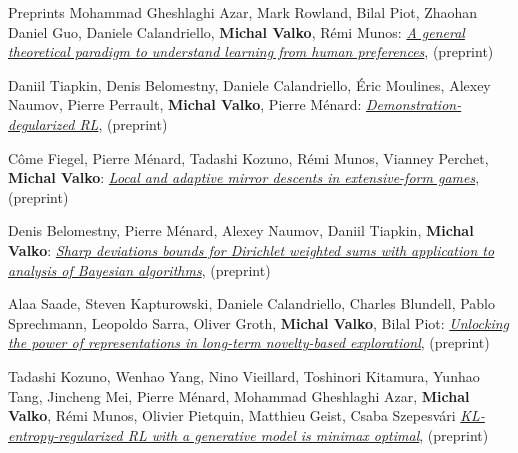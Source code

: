 \documentclass{resume}
\begin{document}
\begin{category}{Preprints}
\citembullet
Mohammad Gheshlaghi Azar, Mark Rowland, Bilal Piot, Zhaohan Daniel Guo, Daniele Calandriello,  {\bf Michal Valko},  R\' emi Munos:
\href{https://arxiv.org/pdf/2310.17303}{\emph{A general theoretical paradigm to understand learning from human preferences}},
({\sf preprint}) 

\citembullet
Daniil Tiapkin, Denis Belomestny, Daniele Calandriello, \' Eric Moulines, Alexey Naumov,  Pierre Perrault, {\bf Michal Valko}, Pierre M\' enard: 
\href{https://arxiv.org/pdf/2310.12036}{\emph{Demonstration-degularized RL}},
({\sf preprint}) 


\citembullet
C\^ome  Fiegel, Pierre Ménard, Tadashi Kozuno, R\' emi Munos, Vianney Perchet,  {\bf Michal Valko}:
\href{https://arxiv.org/pdf/2309.00656.pdf}{\emph{Local and adaptive mirror descents in extensive-form games}},
({\sf preprint}) 



\citembullet
Denis Belomestny, Pierre Ménard, Alexey Naumov, Daniil Tiapkin,  {\bf Michal Valko}:
\href{https://arxiv.org/pdf/2304.03056.pdf}{\emph{Sharp deviations bounds for Dirichlet weighted sums with application to analysis of Bayesian algorithms}},
({\sf preprint}) 

\citembullet
Alaa Saade, Steven Kapturowski, Daniele Calandriello, Charles Blundell, Pablo Sprechmann, Leopoldo Sarra, Oliver Groth,  {\bf Michal Valko}, Bilal Piot:
\href{https://arxiv.org/pdf/2305.01521.pdf}{\emph{Unlocking the power of representations in long-term novelty-based explorationl}},
({\sf preprint}) 

\citembullet
Tadashi Kozuno, Wenhao Yang, Nino Vieillard, Toshinori Kitamura, Yunhao Tang, Jincheng Mei, Pierre M\' enard, Mohammad Gheshlaghi Azar, {\bf Michal Valko}, R\' emi Munos, Olivier Pietquin, Matthieu Geist, Csaba Szepesv\' ari
\href{https://arxiv.org/pdf/2205.14211.pdf}{\emph{KL-entropy-regularized RL with a generative model is minimax optimal}},
({\sf preprint}) 
\end{category}
\end{document}
